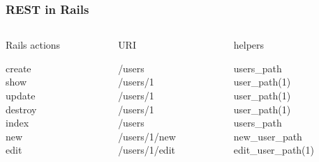 


\begin{frame}
  \frametitle{REST in Rails}
  \begin{columns}
    \begin{column}{2cm}
      \begin{center}Rails actions\end{center}
        create\\
        show\\
        update\\
        destroy\\
        index\\
        new\\
        edit
    \end{column}
    \begin{column}{2cm}
      \begin{center}URI\end{center}
      /users\\
      /users/1\\
      /users/1\\
      /users/1\\
      /users\\
      /users/1/new\\
      /users/1/edit
    \end{column}
    \begin{column}{2cm}
      \begin{center}helpers\end{center}
        users\_path\\
        user\_path(1)\\
        user\_path(1)\\
        user\_path(1)\\
        users\_path\\
        new\_user\_path\\
        edit\_user\_path(1)
    \end{column}
  \end{columns}
\end{frame}


